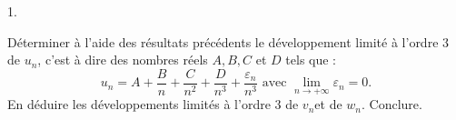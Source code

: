 \documentclass[11pt]{article}%
\begin{document}
\begin{noliste}{1.}
\item Déterminer à l'aide des résultats précédents le développement
limité à
l'ordre $3$ de $u_{n}$, c'est à dire des nombres réels $A,B,C$ et $D$
tels
que : 
\[
u_{n} = A + \dfrac{B}{n} + \dfrac{C}{n^{2}} + \dfrac{D}{n^{3}} +
\dfrac{\varepsilon
_{n}}{n^{3}}\text{ avec }\underset{n\rightarrow + \infty }{\lim
}\varepsilon
_{n} = 0.
\]
En déduire les développements limités à l'ordre $3$ de $v_{n}$et de
$w_{n}$.
Conclure.
\end{noliste}

\label{fin}
\end{document}
